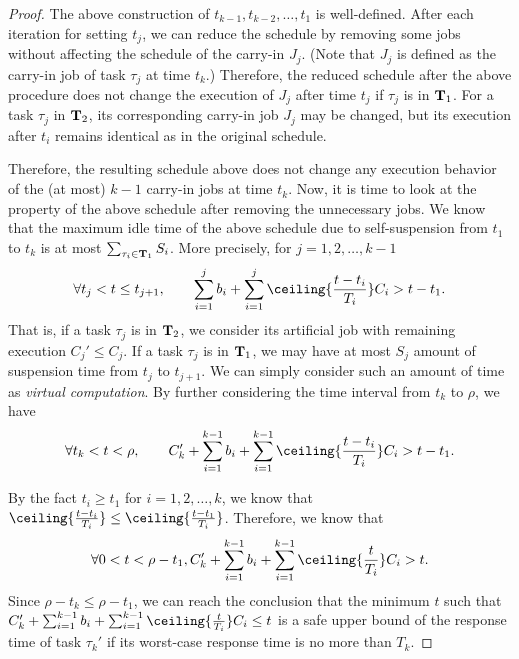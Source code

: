 \begin{proof}
The above construction of $t_{k-1}, t_{k-2}, \ldots, t_1$ is well-defined. After each iteration for setting $t_j$, we can reduce the schedule by removing some jobs without affecting the schedule of the carry-in $J_j$. (Note that $J_j$ is defined as the carry-in job of task $\tau_j$ at time $t_k$.) Therefore, the reduced schedule after the above procedure does not change the execution of $J_j$ after time $t_j$ if $\tau_j$ is in ${\bf T}_1$. For a task $\tau_j$ in ${\bf T}_2$, its corresponding carry-in job $J_j$ may be changed, but its execution after $t_i$ remains identical as in the original schedule. 

Therefore, the resulting schedule above does not change any execution behavior of the (at most) $k-1$ carry-in jobs at time $t_k$. Now, it is time to look at the property of the above schedule after removing the unnecessary jobs. We know that the maximum idle time of the above schedule due to self-suspension from $t_1$ to $t_k$ is at most $\sum_{\tau_i \in {\bf T}_1} S_i$. More precisely, for $j=1,2,\ldots,k-1$
\[
\forall t_j < t \leq t_{j+1},\qquad  \sum_{i=1}^{j} b_i + \sum_{i=1}^j \ceiling{\frac{t- t_i}{T_i} } C_i > t-t_1.
\]
That is, if a task $\tau_j$ is in ${\bf T}_2$, we consider its artificial job with remaining execution $C_j' \leq C_j$.  If a task $\tau_j$ is in ${\bf T}_1$, we may have at most $S_j$ amount of suspension time from $t_j$ to $t_{j+1}$. We can simply consider such an amount of time as \emph{virtual computation}. 
By further considering the time interval from $t_k$ to $\rho$, we have
\[
\forall t_k < t < \rho,\qquad  C_k'+\sum_{i=1}^{k-1} b_i + \sum_{i=1}^{k-1} \ceiling{\frac{t- t_i}{T_i} } C_i > t-t_1.
\]

By the fact $t_i \geq t_1$ for $i=1,2,\ldots,k$, we know that $\ceiling{\frac{t- t_i}{T_i} } \leq \ceiling{\frac{t- t_1}{T_i} }$. Therefore, we know that
\[
\forall 0 < t < \rho-t_1, C_k'+\sum_{i=1}^{k-1} b_i + \sum_{i=1}^{k-1} \ceiling{\frac{t}{T_i} } C_i > t.
\]
Since $\rho-t_k \leq \rho-t_1$, we can reach the conclusion that the minimum $t$ such that $C_k'+\sum_{i=1}^{k-1} b_i + \sum_{i=1}^{k-1} \ceiling{\frac{t}{T_i} } C_i \leq t$ is a safe upper bound of the response time of task $\tau_k'$ if its worst-case response time is no more than $T_k$.
\end{proof}
  
  

  
  
  
  
  
  
  
  
